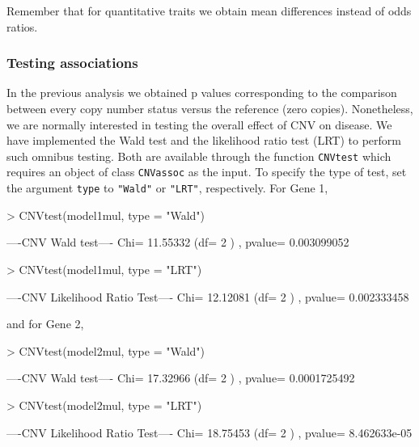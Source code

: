 \documentclass[11pt]{article}
\begin{document}
Remember that for quantitative traits we obtain mean differences instead of odds ratios.




\subsubsection{Testing associations}

In the previous analysis we obtained p values corresponding to the comparison between every copy number status versus the reference 
(zero copies). Nonetheless, we are normally interested in testing the overall effect of CNV on disease. We have implemented the Wald test and the likelihood ratio test (LRT) to perform such omnibus testing. Both are available through the function \texttt{CNVtest}
which requires an object of class {\tt CNVassoc} as the input. To specify the type of test, set the argument \texttt{type} 
to \texttt{"Wald"} or \texttt{"LRT"}, respectively. For Gene 1,


\begin{Schunk}
\begin{Sinput}
> CNVtest(model1mul, type = "Wald")
\end{Sinput}
\begin{Soutput}
----CNV Wald test----
Chi= 11.55332 (df= 2 ) , pvalue= 0.003099052 
\end{Soutput}
\begin{Sinput}
> CNVtest(model1mul, type = "LRT")
\end{Sinput}
\begin{Soutput}
----CNV Likelihood Ratio Test----
Chi= 12.12081 (df= 2 ) , pvalue= 0.002333458 
\end{Soutput}
\end{Schunk}

%
and for Gene 2,
%

\begin{Schunk}
\begin{Sinput}
> CNVtest(model2mul, type = "Wald")
\end{Sinput}
\begin{Soutput}
----CNV Wald test----
Chi= 17.32966 (df= 2 ) , pvalue= 0.0001725492 
\end{Soutput}
\begin{Sinput}
> CNVtest(model2mul, type = "LRT")
\end{Sinput}
\begin{Soutput}
----CNV Likelihood Ratio Test----
Chi= 18.75453 (df= 2 ) , pvalue= 8.462633e-05 
\end{Soutput}
\end{Schunk}
\end{document}
